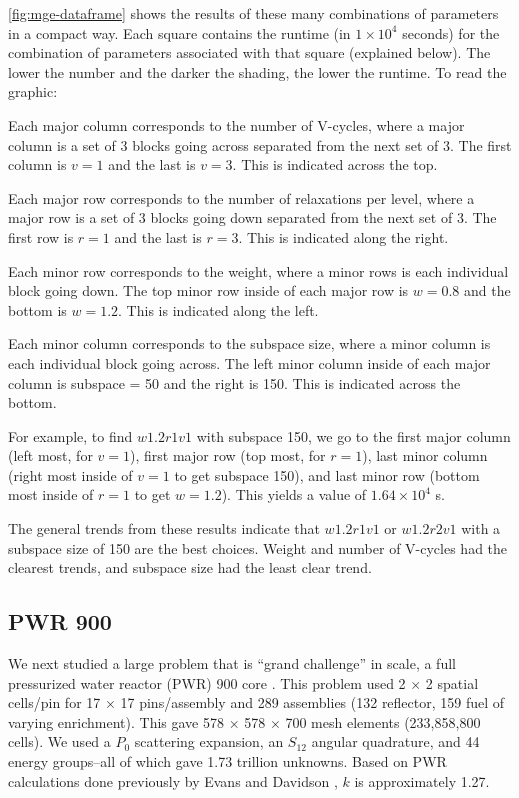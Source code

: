 \documentclass{article}                                                                           %
\begin{document}
\autoref{fig:mge-dataframe} shows the results of these many combinations of parameters in a compact way. 
Each square contains the runtime (in $1\times 10^{4}$ seconds) for the combination of parameters associated with that square (explained below). 
The lower the number and the darker the shading, the lower the runtime. 
To read the graphic:
\begin{compactitem}
\item Each major column corresponds to the number of V-cycles, where a major column is a set of 3 blocks going across separated from the next set of 3. 
The first column is $v = 1$ and the last is $v = 3$. 
This is indicated across the top.
%
\item Each major row corresponds to the number of relaxations per level, where a major row is a set of 3 blocks going down separated from the next set of 3. 
The first row is $r = 1$ and the last is $r = 3$. 
This is indicated along the right.
%
\item Each minor row corresponds to the weight, where a minor rows is each individual block going down. 
The top minor row inside of each major row is $w = 0.8$ and the bottom is $w = 1.2$. 
This is indicated along the left.
%
\item Each minor column corresponds to the subspace size, where a minor column is each individual block going across. 
The left minor column inside of each major column is subspace = 50 and the right is 150.
This is indicated across the bottom.
\end{compactitem}
For example, to find $w1.2r1v1$ with subspace 150, we go to the first major column (left most, for $v=1$), first major row (top most, for $r=1$), last minor column (right most inside of $v=1$ to get subspace 150), and last minor row (bottom most inside of $r=1$ to get $w=1.2$). This yields a value of $1.64 \times 10^4$ s. 

The general trends from these results indicate that $w1.2r1v1$ or $w1.2r2v1$ with a subspace size of 150 are the best choices. Weight and number of V-cycles had the clearest trends, and subspace size had the least clear trend. 


\subsection{PWR 900}
\label{subsec:PWR}
We next studied a large problem that is ``grand challenge'' in scale, a full pressurized water reactor (PWR) 900 core \cite{evans2009d}. This problem used 2 $\times$ 2 spatial cells/pin for 17 $\times$ 17 pins/assembly and 289 assemblies (132 reflector, 159 fuel of varying enrichment). This gave 578 $\times$ 578 $\times$ 700 mesh elements (233,858,800 cells). We used a $P_0$ scattering expansion, an $S_{12}$ angular quadrature, and 44 energy groups--all of which gave 1.73 trillion unknowns. Based on PWR calculations done previously by Evans and Davidson \cite{Evans2010}, $k$ is approximately 1.27. 
\end{document}
